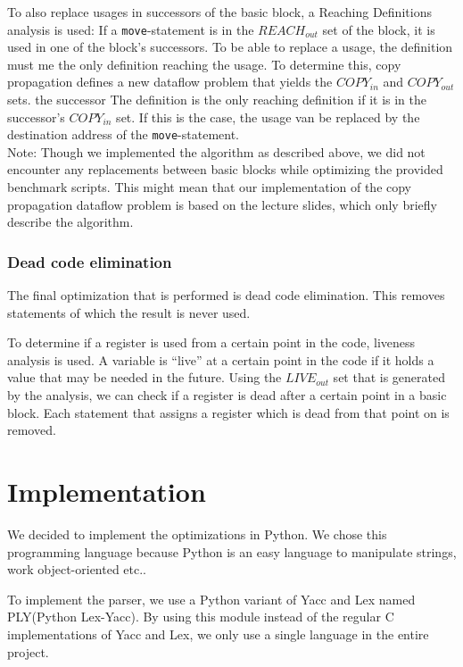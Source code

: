\documentclass[10pt,a4paper]{article}
\begin{document}
To also replace usages in successors of the basic block, a Reaching Definitions
analysis is used: If a \texttt{move}-statement is in the $REACH_{out}$ set of
the block, it is used in one of the block's successors. To be able to replace a
usage, the definition must me the only definition reaching the usage. To
determine this, copy propagation defines a new dataflow problem that yields the
$COPY_{in}$ and $COPY_{out}$ sets. the successor The definition is the only
reaching definition if it is in the successor's $COPY_{in}$ set. If this is the
case, the usage van be replaced by the destination address of the
\texttt{move}-statement. \\
Note: Though we implemented the algorithm as described above, we did not
encounter any replacements between basic blocks while optimizing the provided
benchmark scripts. This might mean that our implementation of the copy
propagation dataflow problem is based on the lecture slides, which only briefly
describe the algorithm.

\subsubsection{Dead code elimination}

The final optimization that is performed is dead code elimination. This removes
statements of which the result is never used.

To determine if a register is used from a certain point in the code, liveness
analysis is used. A variable is ``live'' at a certain point in the code if it
holds a value that may be needed in the future. Using the $LIVE_{out}$ set
that is generated by the analysis, we can check if a register is dead after a
certain point in a basic block. Each statement that assigns a register which
is dead from that point on is removed.

\section{Implementation}

We decided to implement the optimizations in Python. We chose this programming
language because Python is an easy language to manipulate strings, work
object-oriented etc..

To implement the parser, we use a Python variant of Yacc and Lex named
PLY(Python Lex-Yacc). By using this module instead of the regular C
implementations of Yacc and Lex, we only use a single language in the entire
project.
\end{document}
